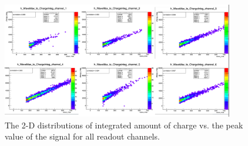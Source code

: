\begin{figure}[htbp]
   \centering
   \includegraphics[width=0.9\textwidth]{figures/testbeam_analysis.png}
   \caption{The 2-D distributions of integrated amount of charge vs. the peak value of the signal for all readout channels.}
   \label{fig:testbeam_analysis}
\end{figure}






